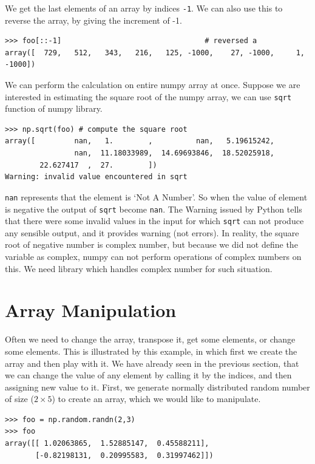 \documentclass[10pt]{book}
\begin{document}
{We get the last elements of an array by indices \verb"-1". We can also use this to reverse the array, by giving the increment of -1.
\beforeverb \begin{verbatim}
>>> foo[::-1]                                 # reversed a
array([  729,   512,   343,   216,   125, -1000,    27, -1000,     1, -1000])
\end{verbatim} \afterverb
We can perform the calculation on entire numpy array at once. Suppose we are interested in estimating the square root of the numpy array, we can use \verb"sqrt" function of numpy library. 
\beforeverb \begin{verbatim}
>>> np.sqrt(foo) # compute the square root 
array([         nan,   1.        ,          nan,   5.19615242,
                nan,  11.18033989,  14.69693846,  18.52025918,
        22.627417  ,  27.        ])
Warning: invalid value encountered in sqrt
\end{verbatim} \afterverb

\verb"nan" represents that the element is `Not A Number'. So when the value of element is negative the output of \verb"sqrt" become \verb"nan". The Warning issued by Python tells that there were some invalid values in the input for which \verb"sqrt" can not produce any sensible output, and it provides  warning (not errors). In reality, the square root of negative number is complex number, but because we did not define the variable as complex, numpy can not perform operations of complex numbers on this. We need library which handles complex number for such situation. 

\section{Array Manipulation}
Often we need to change the array, transpose it, get some elements, or change some elements. This is illustrated by this example, in which first we create the array and then play with it. We have already seen in the previous section, that we can change the value of any element by calling it by the indices, and then assigning new value to it. First, we generate normally distributed random number of size ($2 \times 5$) to create an array, which we would like to manipulate. 
\beforeverb \begin{verbatim}
>>> foo = np.random.randn(2,3)
>>> foo
array([[ 1.02063865,  1.52885147,  0.45588211],
       [-0.82198131,  0.20995583,  0.31997462]])
\end{verbatim} \afterverb

}
\end{document}
